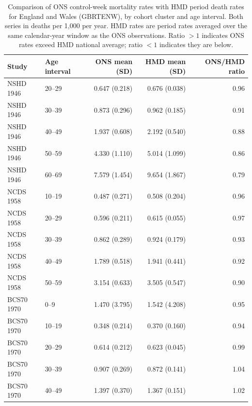 \begin{table}[htbp]
\centering
\small
\caption{Comparison of ONS control-week mortality rates with HMD period death rates for England and Wales (GBRTENW), by cohort cluster and age interval. Both series in deaths per 1,000 per year. HMD rates are period rates averaged over the same calendar-year window as the ONS observations. Ratio $>1$ indicates ONS rates exceed HMD national average; ratio $<1$ indicates they are below.}
\label{tab:hmd_comparison}
\begin{tabular}{llrrr}
\toprule
Study & Age interval & ONS mean (SD) & HMD mean (SD) & ONS/HMD ratio \\
\midrule
NSHD 1946 & 20–29 & 0.647 (0.218) & 0.676 (0.038) & 0.96 \\
NSHD 1946 & 30–39 & 0.873 (0.296) & 0.962 (0.185) & 0.91 \\
NSHD 1946 & 40–49 & 1.937 (0.608) & 2.192 (0.540) & 0.88 \\
NSHD 1946 & 50–59 & 4.330 (1.110) & 5.014 (1.099) & 0.86 \\
NSHD 1946 & 60–69 & 7.579 (1.454) & 9.654 (1.867) & 0.79 \\
\midrule
NCDS 1958 & 10–19 & 0.487 (0.271) & 0.508 (0.204) & 0.96 \\
NCDS 1958 & 20–29 & 0.596 (0.211) & 0.615 (0.055) & 0.97 \\
NCDS 1958 & 30–39 & 0.862 (0.289) & 0.924 (0.179) & 0.93 \\
NCDS 1958 & 40–49 & 1.789 (0.518) & 1.941 (0.441) & 0.92 \\
NCDS 1958 & 50–59 & 3.154 (0.633) & 3.505 (0.547) & 0.90 \\
\midrule
BCS70 1970 & 0–9 & 1.470 (3.795) & 1.542 (4.208) & 0.95 \\
BCS70 1970 & 10–19 & 0.348 (0.214) & 0.370 (0.160) & 0.94 \\
BCS70 1970 & 20–29 & 0.614 (0.212) & 0.623 (0.045) & 0.99 \\
BCS70 1970 & 30–39 & 0.907 (0.269) & 0.872 (0.141) & 1.04 \\
BCS70 1970 & 40–49 & 1.397 (0.370) & 1.367 (0.151) & 1.02 \\
\bottomrule
\end{tabular}
\end{table}